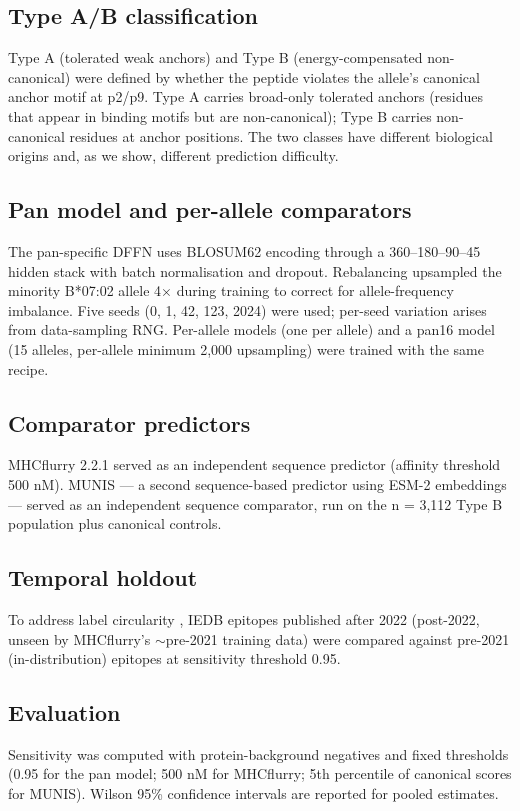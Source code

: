 \documentclass[10pt]{article}
\begin{document}
\subsection{Type A/B classification}
Type A (tolerated weak anchors) and Type B (energy-compensated non-canonical) were defined by whether the peptide violates the allele's canonical anchor motif at p2/p9. Type A carries broad-only tolerated anchors (residues that appear in binding motifs but are non-canonical); Type B carries non-canonical residues at anchor positions. The two classes have different biological origins and, as we show, different prediction difficulty.

\subsection{Pan model and per-allele comparators}
The pan-specific DFFN uses BLOSUM62 encoding \cite{Henikoff92} through a 360--180--90--45 hidden stack with batch normalisation and dropout. Rebalancing upsampled the minority B*07:02 allele 4$\times$ during training to correct for allele-frequency imbalance. Five seeds (0, 1, 42, 123, 2024) were used; per-seed variation arises from data-sampling RNG. Per-allele models (one per allele) and a pan16 model (15 alleles, per-allele minimum 2,000 upsampling) were trained with the same recipe.

\subsection{Comparator predictors}
MHCflurry 2.2.1 \cite{ODonnell20} served as an independent sequence predictor (affinity threshold 500 nM). MUNIS \cite{Wohlwend25} --- a second sequence-based predictor using ESM-2 embeddings \cite{Rives21} --- served as an independent sequence comparator, run on the n = 3,112 Type B population plus canonical controls.

\subsection{Temporal holdout}
To address label circularity \cite{Preibisch26}, IEDB epitopes published after 2022 (post-2022, unseen by MHCflurry's $\sim$pre-2021 training data) were compared against pre-2021 (in-distribution) epitopes at sensitivity threshold 0.95.

\subsection{Evaluation}
Sensitivity was computed with protein-background negatives and fixed thresholds (0.95 for the pan model; 500 nM for MHCflurry; 5th percentile of canonical scores for MUNIS). Wilson 95\% confidence intervals are reported for pooled estimates.
\end{document}
